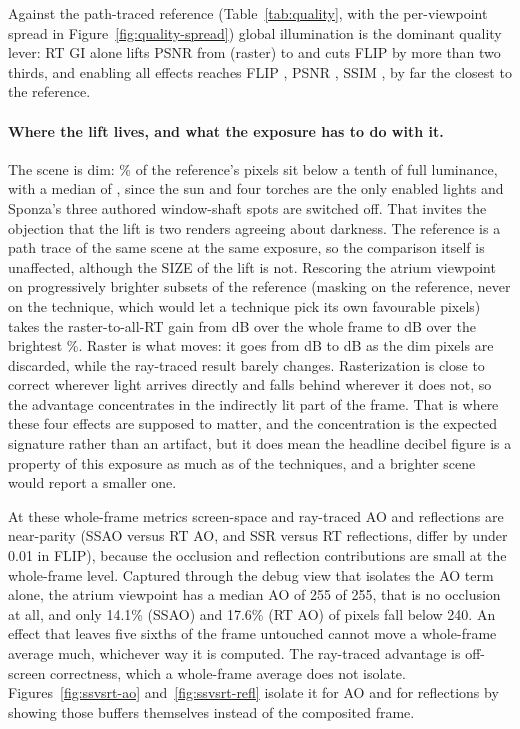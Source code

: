 Against the path-traced reference (Table~\ref{tab:quality}, with the per-viewpoint spread in
Figure~\ref{fig:quality-spread}) global illumination is the dominant
quality lever: RT GI alone lifts
PSNR from \qRasterPsnr{} (raster) to \qRtGiPsnr{} and cuts FLIP by more than two thirds, and enabling
all effects reaches FLIP \qAllRtFlip{}, PSNR \qAllRtPsnr{}, SSIM \qAllRtSsim{}, by far the closest to
the reference.

\paragraph{Where the lift lives, and what the exposure has to do with it.} The scene is dim:
\exDarkShare\% of the reference's pixels sit below a tenth of full luminance, with a median of
\exMedianLuma{}, since the sun and four torches are the only enabled lights and Sponza's three
authored window-shaft spots are switched off. That invites the objection that the lift is two renders
agreeing about darkness. The reference is a path trace of the same scene at the same exposure, so the
comparison itself is unaffected, although the SIZE of the lift is not. Rescoring the atrium viewpoint
on progressively brighter subsets of the reference (masking on the reference, never on the technique,
which would let a technique pick its own favourable pixels) takes the raster-to-all-RT gain from
\exLiftAll{} dB over the whole frame to \exLiftLit{} dB over the brightest \exLitShare\%. Raster is
what moves: it goes from \exRasterAll{} dB to \exRasterLit{} dB as the dim pixels are discarded, while
the ray-traced result barely changes. Rasterization is close to correct wherever light arrives
directly and falls behind wherever it does not, so the advantage concentrates in the indirectly lit
part of the frame. That is where these four effects are supposed to matter, and the concentration is
the expected signature rather than an artifact, but it does mean the headline decibel figure is a
property of this exposure as much as of the techniques, and a brighter scene would report a smaller
one.

At these
whole-frame metrics screen-space and ray-traced AO and reflections are near-parity (SSAO versus RT AO,
and SSR versus RT reflections, differ by under 0.01 in FLIP), because the occlusion and reflection
contributions are small at the whole-frame level. Captured through the debug view that isolates the
AO term alone, the atrium viewpoint has a median AO
of 255 of 255, that is no occlusion at all, and only 14.1\% (SSAO) and 17.6\% (RT AO) of pixels fall
below 240. An effect that leaves five sixths of the frame untouched cannot move a whole-frame average
much, whichever way it is computed. The ray-traced advantage is off-screen correctness, which a
whole-frame average does not isolate. Figures~\ref{fig:ssvsrt-ao} and~\ref{fig:ssvsrt-refl} isolate
it for AO and for reflections by showing those buffers themselves instead of the composited frame.

